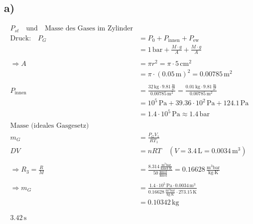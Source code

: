 

\subsection*{a)}
\begin{align*}
    P_{st} \quad \text{und} \quad \text{Masse des Gases im Zylinder} \\
    \text{Druck:} \quad P_G &= P_0 + P_{\text{innen}} + P_{\text{ew}} \\
    &= 1 \, \text{bar} + \frac{M \cdot g}{A} + \frac{M \cdot g}{A} \\
    & \\
    \Rightarrow A &= \pi r^2 = \pi \cdot 5 \, \text{cm}^2 \\
    &= \pi \cdot (0.05 \, \text{m})^2 = 0.00785 \, \text{m}^2 \\
    & \\
    P_{\text{innen}} &= \frac{32 \, \text{kg} \cdot 9.81 \, \frac{\text{m}}{\text{s}^2}}{0.00785 \, \text{m}^2} = \frac{0.01 \, \text{kg} \cdot 9.81 \, \frac{\text{m}}{\text{s}^2}}{0.00785 \, \text{m}^2} \\
    &= 10^5 \, \text{Pa} + 39.36 \cdot 10^2 \, \text{Pa} + 124.1 \, \text{Pa} \\
    &= 1.4 \cdot 10^5 \, \text{Pa} \approx 1.4 \, \text{bar} \\
    & \\
    \text{Masse (ideales Gasgesetz)} \\
    m_G &= \frac{P_G V_1}{R T_1} \\
    D V &= n R T \quad (V = 3.4 \, \text{L} = 0.0034 \, \text{m}^3) \\
    & \\
    \Rightarrow R_3 = \frac{R}{M} &= \frac{8.314 \, \frac{\text{m}^3 \text{bar}}{\text{kmol} \cdot \text{K}}}{50 \, \frac{\text{kmol}}{\text{kmol}}} = 0.16628 \, \frac{\text{m}^3 \text{bar}}{\text{kg} \cdot \text{K}} \\
    & \\
    \Rightarrow m_G &= \frac{1.4 \cdot 10^5 \, \text{Pa} \cdot 0.0034 \, \text{m}^3}{0.16628 \, \frac{\text{m}^3 \text{bar}}{\text{kg} \cdot \text{K}} \cdot 273.15 \, \text{K}} \\
    &= 0.10342 \, \text{kg} \\
    & \\
    & \\
    3.42 \, \text{s} \\
\end{align*}